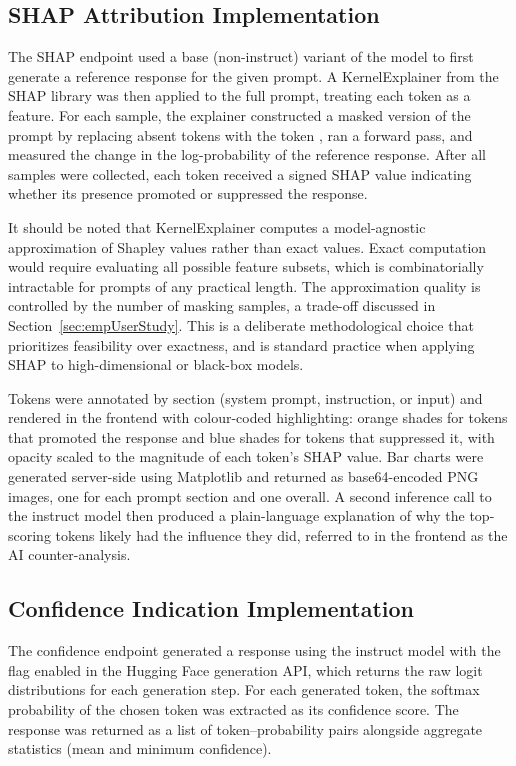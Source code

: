 \subsection{SHAP Attribution Implementation}
\label{sec:shap}

The SHAP endpoint used a base (non-instruct) variant of the model to first generate a reference response for the given prompt. A KernelExplainer from the SHAP library \cite{lundberg_unified_2017} was then applied to the full prompt, treating each token as a feature. For each sample, the explainer constructed a masked version of the prompt by replacing absent tokens with the token \localtt{[MASKED]}, ran a forward pass, and measured the change in the log-probability of the reference response. After all samples were collected, each token received a signed SHAP value indicating whether its presence promoted or suppressed the response.

It should be noted that KernelExplainer computes a model-agnostic approximation of Shapley values rather than exact values. Exact computation would require evaluating all possible feature subsets, which is combinatorially intractable for prompts of any practical length. The approximation quality is controlled by the number of masking samples, a trade-off discussed in Section~\ref{sec:empUserStudy}. This is a deliberate methodological choice that prioritizes feasibility over exactness, and is standard practice when applying SHAP to high-dimensional or black-box models.

Tokens were annotated by section (system prompt, instruction, or input) and rendered in the frontend with colour-coded highlighting: orange shades for tokens that promoted the response and blue shades for tokens that suppressed it, with opacity scaled to the magnitude of each token's SHAP value. Bar charts were generated server-side using Matplotlib and returned as base64-encoded PNG images, one for each prompt section and one overall. A second inference call to the instruct model then produced a plain-language explanation of why the top-scoring tokens likely had the influence they did, referred to in the frontend as the AI counter-analysis.

\subsection{Confidence Indication Implementation}
\label{sec:conf}

The confidence endpoint generated a response using the instruct model with the  flag enabled in the Hugging Face generation API, which returns the raw logit distributions for each generation step. For each generated token, the softmax probability of the chosen token was extracted as its confidence score. The response was returned as a list of token–probability pairs alongside aggregate statistics (mean and minimum confidence).

